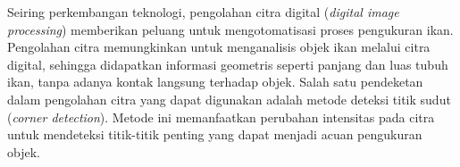 Seiring perkembangan teknologi, pengolahan citra digital (\emph{digital image processing}) memberikan peluang untuk mengotomatisasi proses pengukuran ikan.
Pengolahan citra memungkinkan untuk menganalisis objek ikan melalui citra digital, sehingga didapatkan informasi geometris seperti panjang dan luas tubuh ikan, tanpa adanya kontak langsung terhadap objek.
Salah satu pendeketan dalam pengolahan citra yang dapat digunakan adalah metode deteksi titik sudut (\emph{corner detection}). Metode ini memanfaatkan perubahan intensitas pada citra untuk mendeteksi titik-titik penting yang dapat menjadi acuan pengukuran objek. 

